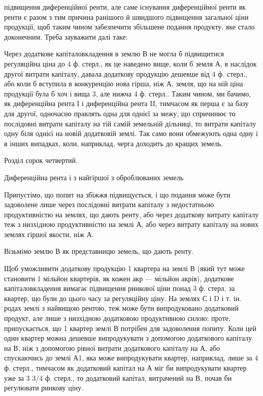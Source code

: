 підвищення диференційної ренти, але саме існування диференційної ренти як
ренти є разом з тим причина ранішого й швидшого підвищення загальної ціни
продукції, щоб таким чином забезпечити збільшене подання продукту, яке стало доконечним.
Треба зауважити далі таке:

Через додаткове капіталовкладення в землю В не могла б підвищитися
регуляційна ціна до 4 ф. стерл., як це наведено вище, коли б земля А, в наслідок
другої витрати капіталу, давала додаткову продукцію дешевше від 4 ф.
стерл., або коли б вступила в конкуренцію нова гірша, ніж А, земля, що на
ній ціна продукції була б хоч і вища 3, але нижча 4 ф. стерл.. Таким чином,
ми бачимо, як диференційна рента І і диференційна рента II, тимчасом як
перша є за базу для другої, одночасно правлять одна для однієї за межу, що
спричинює то послідовні витрати капіталу на тій самій земельній дільниці, то
витрати капіталу одну біля однієї на новій додатковій землі. Так само вони
обмежують одна одну і в інших випадках, коли, наприклад, черга доходить до
кращих земель.

Розділ сорок четвертий.

Диференційна рента і з найгіршої з оброблюваних земель

Припустімо, що попит на збіжжя підвищується, і що подання може бути
задоволене лише через послідовні витрати капіталу з недостатньою продуктивністю
на землях, що дають ренту, або через додаткову витрату капіталу
теж з низхідною продуктивністю на землі А, або через витрату капіталу на
нових землях гіршої якости, ніж А.

Візьмімо землю В як представницю земель, що дають ренту.

Щоб уможливити додаткову продукцію 1 квартера на землі В (який
тут може становити 1 мільйон квартерів, як кожен акр — мільйон акрів), додаткове
капіталовкладення вимагає підвищення ринкової ціни понад 3 ф. стерл.
за квартер, що були до цього часу за регуляційну ціну. На землях С і D і т.
ін. родах землі з найвищою рентою, теж може бути випродуковано додатковий
продукт, але лише з низхідною додатковою продуктивною силою; проте,
припускається, що 1 квартер землі В потрібен для задоволення попиту.
Коли цей один квартер можна дешевше випродукувати з допомогою додаткового
капіталу на В, ніж з допомогою рівної витрати додаткового капіталу
на А, або спускаючись до землі А1, яка може випродукувати квартер, наприклад,
лише за 4 ф. стерл., тимчасом як додатковий капітал на А міг би випродукувати
квартер уже за 3  3/4 ф. стерл., то додатковий капітал, витрачений на
В, почав би регулювати ринкову ціну.

